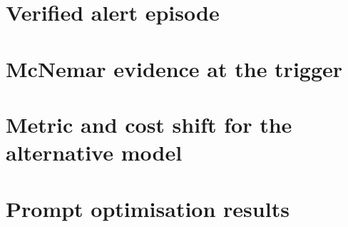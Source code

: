 \section{Verified alert episode}
\label{sec:alerted-degradation-case}

\section{McNemar evidence at the trigger}
\label{sec:mcnemar-at-trigger}

\section{Metric and cost shift for the alternative model}
\label{sec:metric-alternative-comparison}

\section{Prompt optimisation results}
\label{sec:prompt-optimisation-results}
